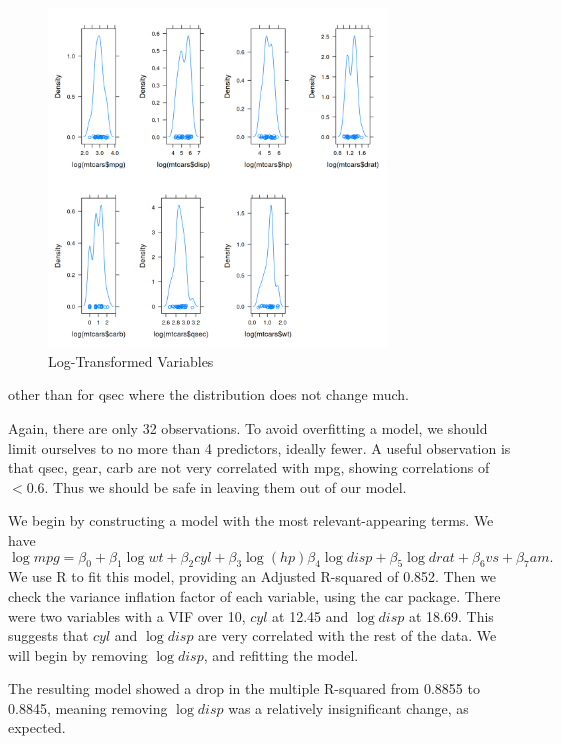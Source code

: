 \documentclass[a4paper]{article}
\begin{document}
\begin{figure}[H]
	\centering
	\includegraphics[width=0.8\textwidth]{"../transformedDensities.png"}
	\caption{Log-Transformed Variables}
	\label{fig:Log-Transformed-Variables}
\end{figure}

other than for qsec where the distribution does not change much.

Again, there are only 32 observations. To avoid overfitting a model, we should limit ourselves to no more than 4 predictors, ideally fewer. A useful observation is that qsec, gear, carb are not very correlated with mpg, showing correlations of \(<0.6\). Thus we should be safe in leaving them out of our model. 

We begin by constructing a model with the most relevant-appearing terms. We have
\begin{equation}
\log mpg = \beta_0 + \beta_1 \log wt + \beta_2 cyl +\beta_3\log(hp) \beta_4 \log disp + \beta_5 \log drat + \beta_6 vs + \beta_7 am.
\end{equation}
We use R \cite{r} to fit this model, providing an Adjusted R-squared of 0.852. Then we check the variance inflation factor of each variable, using the car package. There were two variables with a VIF over 10, \(cyl\) at 12.45 and \(\log disp\) at 18.69. This suggests that \(cyl\) and \(\log disp\) are very correlated with the rest of the data. We will begin by removing \(\log disp\), and refitting the model. 

The resulting model showed a drop in the multiple R-squared from 0.8855 to 0.8845, meaning removing \(\log disp\) was a relatively insignificant change, as expected. 
\end{document}
